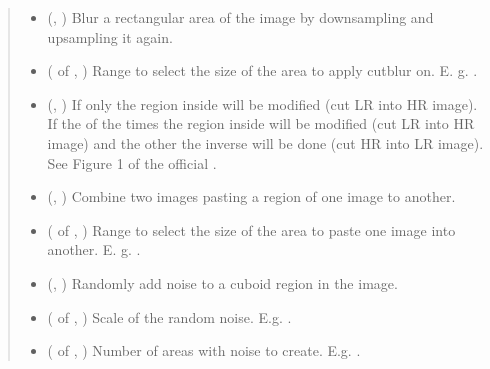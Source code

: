 \documentclass[letterpaper,10pt,english]{sphinxmanual}
\begin{document}
\begin{fulllineitems}
\begin{quote}
\begin{description}
\begin{itemize}
\item {} 
 (, ) \textendash{} Blur a rectangular area of the image by downsampling and upsampling it again.

\item {} 
 ( of , ) \textendash{} Range to select the size of the area to apply cutblur on. E. g. .

\item {} 
 (, ) \textendash{} If  only the region inside will be modified (cut LR into HR image). If  the  of the
times the region inside will be modified (cut LR into HR image) and the other  the inverse will be
done (cut HR into LR image). See Figure 1 of the official .

\item {} 
 (, ) \textendash{} Combine two images pasting a region of one image to another.

\item {} 
 ( of , ) \textendash{} Range to select the size of the area to paste one image into another. E. g. .

\item {} 
 (, ) \textendash{} Randomly add noise to a cuboid region in the image.

\item {} 
 ( of , ) \textendash{} Scale of the random noise. E.g. .

\item {} 
 ( of , ) \textendash{} Number of areas with noise to create. E.g. .


\end{itemize}
\end{description}
\end{quote}
\end{fulllineitems}
\end{document}
